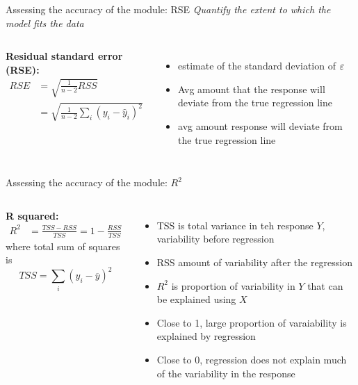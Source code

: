 \documentclass[aspectratio=169,usenames,dvipsnames]{beamer}
\newcommand{\InstructorNotes}[1]{\textit{\color{orange}#1}}
\newcommand{\InstructorList}[1]{
\begin{itemize}
	\color{orange}
	#1
\end{itemize}
}
\begin{document}
\begin{frame}[c]{Assessing the accuracy of the module: RSE}
	\centering
\InstructorNotes{Quantify the extent to which the model fits the data}
\begin{columns}
\textbf{Residual standard error (RSE):}
\begin{align*}
	RSE &= \sqrt{ \frac{1}{n-2} RSS}\\
	& = \sqrt{ \frac{1}{n-2} \sum_i (y_i - \hat y_i)^2}
\end{align*}

\InstructorList{
\item estimate of the standard deviation of $\varepsilon$
\item Avg amount that the response will deviate from the true regression line 
\item  avg amount response will deviate from the true regression line}
\end{columns}

\end{frame}
\begin{frame}[c]{Assessing the accuracy of the module: $R^2$}
	\centering
\begin{columns}
\textbf{R squared:}
\begin{align*}
	R^2 &= \frac{TSS-RSS}{TSS} = 1-\frac{RSS}{TSS}
\end{align*}
where total sum of squares is
\begin{equation*}
	TSS = \sum_i (y_i - \overline y)^2
\end{equation*}
\InstructorList{
\item TSS is total variance in teh response $Y$, variability before regression
\item RSS amount of variability after the regression
\item $R^2$ is proportion of variability in $Y$ that can be explained using $X$
\item Close to 1, large proportion of varaiability is explained by regression
\item Close to 0, regression does not explain much of the variability in the response
}
\end{columns}

\end{frame}
\end{document}
